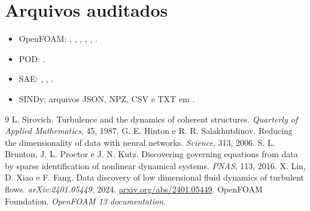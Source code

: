 \documentclass[12pt,a4paper]{article}
\begin{document}
\appendix\section{Arquivos auditados}
\small\begin{itemize}
\item OpenFOAM: , , , , , .
\item POD: .
\item SAE: , , .
\item SINDy: arquivos JSON, NPZ, CSV e TXT em .
\end{itemize}\normalsize
\begin{thebibliography}{9}
 L. Sirovich. Turbulence and the dynamics of coherent structures. \emph{Quarterly of Applied Mathematics}, 45, 1987.
 G. E. Hinton e R. R. Salakhutdinov. Reducing the dimensionality of data with neural networks. \emph{Science}, 313, 2006.
 S. L. Brunton, J. L. Proctor e J. N. Kutz. Discovering governing equations from data by sparse identification of nonlinear dynamical systems. \emph{PNAS}, 113, 2016.
 X. Lin, D. Xiao e F. Fang. Data discovery of low dimensional fluid dynamics of turbulent flows. \emph{arXiv:2401.05449}, 2024. \href{https://arxiv.org/abs/2401.05449}{arxiv.org/abs/2401.05449}.
 OpenFOAM Foundation. \emph{OpenFOAM 13 documentation}.
\end{thebibliography}
\end{document}
